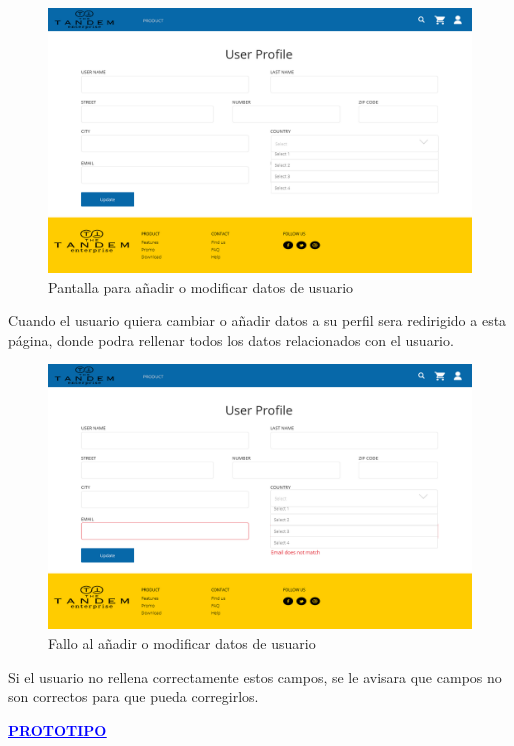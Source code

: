 \documentclass{article}
\begin{document}
\newpage
\begin{figure}[h]
    \centering
    \includegraphics[scale=0.25]{mockup/Update.png}
    \caption{Pantalla para añadir o modificar datos de usuario}
    \label{Fig:Update}
\end{figure}
\quad Cuando el usuario quiera cambiar o añadir datos a su perfil sera redirigido a esta página, donde podra rellenar todos los datos relacionados con el usuario.

\begin{figure}[h]
    \centering
    \includegraphics[scale=0.25]{mockup/Fail_update.png}
    \caption{Fallo al añadir o modificar datos de usuario}
    \label{Fig:Fail_update}
\end{figure}
\quad Si el usuario no rellena correctamente estos campos, se le avisara que campos no son correctos para que pueda corregirlos.\\

\begin{center}
    \href{https://github.com/Nestorbd/Full-Stack-Proyect/tree/master/E-commerce/Doncumentation/FullStack_Prototype}{\textbf{\textcolor{blue}{\underline{PROTOTIPO}}}}
\end{center}
\end{document}
